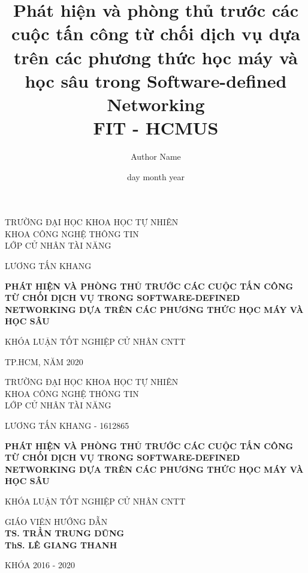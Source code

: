 \documentclass[a4paper,oneside]{report}
\title{
	{Phát hiện và phòng thủ trước các cuộc tấn công từ chối dịch vụ dựa trên các phương thức học máy và học sâu trong Software-defined Networking }\\
	{\large FIT - HCMUS}\\
}
\author{Author Name}
\date{day month year}
\begin{document}
\begin{titlepage} 
\thisfancypage{
\setlength{\fboxsep}{10pt}
\doublebox
}{}
\begin{center}
\begin{large}
TRƯỜNG ĐẠI HỌC KHOA HỌC TỰ NHIÊN\\
KHOA CÔNG NGHỆ THÔNG TIN\\
LỚP CỬ NHÂN TÀI NĂNG \\
\end{large}
\vskip1cm
\vskip1.5cm
\begin{large}
LƯƠNG TẤN KHANG\\
\end{large}
\vskip3cm
\begin{Large}
\bfseries
\onehalfspacing
PHÁT HIỆN VÀ PHÒNG THỦ TRƯỚC CÁC CUỘC TẤN CÔNG TỪ CHỐI DỊCH VỤ TRONG SOFTWARE-DEFINED NETWORKING DỰA TRÊN CÁC PHƯƠNG THỨC HỌC MÁY VÀ HỌC SÂU
\end{Large}
\vskip4cm
\begin{large}
KHÓA LUẬN TỐT NGHIỆP CỬ NHÂN CNTT \\
\end{large}
\vskip5cm
\begin{normalsize}
TP.HCM, NĂM 2020
\end{normalsize}
\end{center}
\end{titlepage}

\begin{titlepage} 
\thisfancypage{
\setlength{\fboxsep}{10pt}
\doublebox
}{}
\begin{center}
\begin{large}
TRƯỜNG ĐẠI HỌC KHOA HỌC TỰ NHIÊN\\
KHOA CÔNG NGHỆ THÔNG TIN\\
LỚP CỬ NHÂN TÀI NĂNG \\
\end{large}
\vskip1cm
\vskip1.5cm
\begin{large}
LƯƠNG TẤN KHANG - 1612865 \\
\end{large}
\vskip2cm
\begin{Large}
\bfseries
\onehalfspacing
PHÁT HIỆN VÀ PHÒNG THỦ TRƯỚC CÁC CUỘC TẤN CÔNG TỪ CHỐI DỊCH VỤ TRONG SOFTWARE-DEFINED NETWORKING DỰA TRÊN CÁC PHƯƠNG THỨC HỌC MÁY VÀ HỌC SÂU
\end{Large}
\vskip1.5cm
\begin{large}
KHÓA LUẬN TỐT NGHIỆP CỬ NHÂN CNTT \\
\end{large}
\vskip1cm
\begin{large}
GIÁO VIÊN HƯỚNG DẪN \\
\textbf{TS. TRẦN TRUNG DŨNG} \\
\textbf{ThS. LÊ GIANG THANH} \\
\end{large}

\vskip4cm
\begin{normalsize}
KHÓA 2016 - 2020
\end{normalsize}
\end{center}
\end{titlepage}
\end{document}

